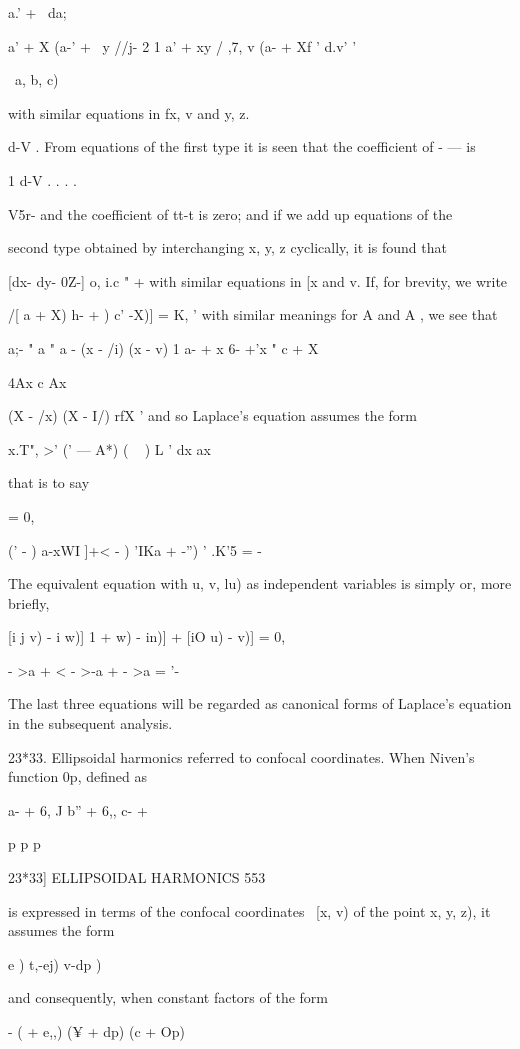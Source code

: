 {{{a.' + \ da;

a' + X (a-' + \ y //j- 2 1 a' + xy / ,7, v (a- + Xf ' d.v' '

\ a, b, c)

with similar equations in fx, v and y, z.

d-V . From equations of the first type it is seen that the coefficient
of - — is

1 d-V . . . .

V5r- and the coefficient of tt-t is zero; and if we add up equations
of the

second type obtained by interchanging x, y, z cyclically, it is found
that

[dx- dy- 0Z-] o, i.c " + with similar equations in [x and v. If, for
brevity, we write

 /[ a + X) h- + ) c' -X)] = K, ' with similar meanings for A and A ,
we see that

a;- " a " a - (x - /i) (x - v) 1 a- + x 6- +'x " c + X

4Ax c Ax

(X - /x) (X - I/) rfX ' and so Laplace's equation assumes the form

x.T", >' (' — A*) ( ~ ) L ' dx ax

that is to say

= 0,

(' - ) a-xWI ]+< - ) 'IKa + -'') ' .K'5 = -

The equivalent equation with u, v, lu) as independent variables is
simply or, more briefly,

[i j v) - i w)] 1 + w) - in)] + [iO u) - v)] = 0,

 - >a + < - >-a + - >a = '-

The last three equations will be regarded as canonical forms of
Laplace's equation in the subsequent analysis.

23*33. Ellipsoidal harmonics referred to confocal coordinates. When
Niven's function 0p, defined as

a- + 6, J b'' + 6,, c- +

p p p

23*33] ELLIPSOIDAL HARMONICS 553

is expressed in terms of the confocal coordinates \ [x, v) of the
point x, y, z), it assumes the form

  e ) t,-ej) v-dp )

and consequently, when constant factors of the form

- ( + e,,) (¥ + dp) (c + Op)

}}}
